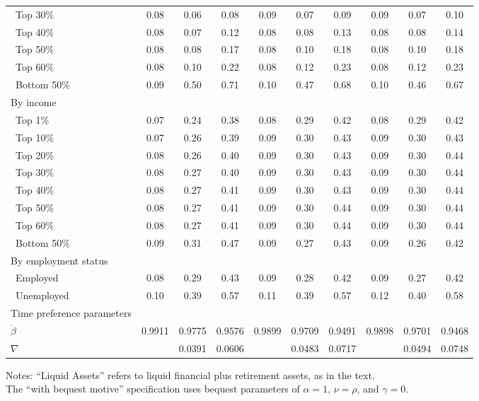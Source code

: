 \documentclass[11pt,a4paper,pdftex]{article}\usepackage[pdftex]{graphicx}\usepackage{epstopdf} \usepackage[pdftex]{hyperref}
\newcommand{\CRRA}{\ensuremath{\rho}}
\newcommand{\Discount}{\ensuremath{\beta}}
\begin{document}
\begin{table}
\begin{minipage}{\textwidth}
\begin{center}
\begin{tabular}{l c c c c c c c c c}
\ Top 30\% & 0.08  & 0.06 & 0.08 & 0.09 & 0.07 & 0.09 & 0.09 & 0.07 & 0.10 \\
\ Top 40\% & 0.08  & 0.07 & 0.12 & 0.08 & 0.08 & 0.13 & 0.08 & 0.08 & 0.14 \\
\ Top 50\% & 0.08  & 0.08 & 0.17 & 0.08 & 0.10 & 0.18 & 0.08 & 0.10 & 0.18 \\
\ Top 60\% & 0.08  & 0.10 & 0.22 & 0.08 & 0.12 & 0.23 & 0.08 & 0.12 & 0.23 \\
\ Bottom 50\% & 0.09  & 0.50 & 0.71 & 0.10 & 0.47 & 0.68 & 0.10 & 0.46 & 0.67 \\
By income  &  & & & & & & & &  \\
\ Top 1\% & 0.07  & 0.24 & 0.38 & 0.08 & 0.29 & 0.42 & 0.08 & 0.29 & 0.42 \\
\ Top 10\% & 0.07  & 0.26 & 0.39 & 0.09 & 0.30 & 0.43 & 0.09 & 0.30 & 0.43 \\
\ Top 20\% & 0.08  & 0.26 & 0.40 & 0.09 & 0.30 & 0.43 & 0.09 & 0.30 & 0.44 \\
\ Top 30\% & 0.08  & 0.27 & 0.40 & 0.09 & 0.30 & 0.43 & 0.09 & 0.30 & 0.44 \\
\ Top 40\% & 0.08  & 0.27 & 0.41 & 0.09 & 0.30 & 0.43 & 0.09 & 0.30 & 0.44 \\
\ Top 50\% & 0.08  & 0.27 & 0.41 & 0.09 & 0.30 & 0.44 & 0.09 & 0.30 & 0.44 \\
\ Top 60\% & 0.08  & 0.27 & 0.41 & 0.09 & 0.30 & 0.44 & 0.09 & 0.30 & 0.44 \\
\ Bottom 50\% & 0.09 & 0.31 & 0.47 & 0.09 & 0.27 & 0.43 & 0.09 & 0.26 & 0.42 \\
By employment status   &  & & & & &  & &  &  \\
\ Employed & 0.08  & 0.29 & 0.43 & 0.09 & 0.28 & 0.42 & 0.09 & 0.27 & 0.42 \\
\ Unemployed & 0.10  & 0.39 & 0.57 & 0.11 & 0.39 & 0.57 & 0.12 & 0.40 & 0.58 \\
\midrule
Time preference parameters   &  & & & & &  & & &  \\
$\grave{\Discount}$   & 0.9911 & 0.9775 & 0.9576 & 0.9899 & 0.9709 & 0.9491 & 0.9898 & 0.9701 & 0.9468 \\
$\nabla$   &  & 0.0391 & 0.0606 &  & 0.0483 & 0.0717 &  & 0.0494 & 0.0748 \\
\bottomrule

\end{tabular}
\end{center}
\footnotesize{Notes: ``Liquid Assets'' refers to liquid financial plus retirement assets, as in the text.
\\The ``with bequest motive'' specification uses bequest parameters of $\alpha = 1$, $\nu = \CRRA$, and $\gamma = 0$.}
\end{minipage}
\end{table}
\end{document}
